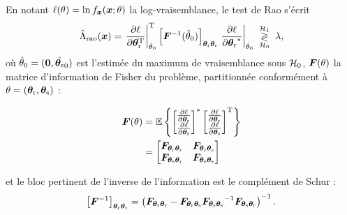 \begin{definition}
\label{def:detection-rao}
  En notant $\ell(\theta)=\ln f_{\boldsymbol{x}}(\boldsymbol{x};\theta)$ la log-vraisemblance, le test de Rao s'écrit
  \begin{equation}
    \hat{\Lambda}_{\mathrm{rao}}(\boldsymbol{x})
    =
    \left.\frac{\partial\ell}{\partial\boldsymbol{\theta}_{\mathrm{r}}^{\mathrm{T}}}\right|_{\hat{\theta}_0}^{\mathrm{T}}
    \left[{\boldsymbol{F}}^{-1}(\hat{\theta}_0)\right]_{\boldsymbol{\theta}_{\mathrm{r}}\boldsymbol{\theta}_{\mathrm{r}}}
    \left.\frac{\partial\ell}{\partial{\boldsymbol{\theta}_{\mathrm{r}}}^{*}}\right|_{\hat{\theta}_0}
    \;\underset{\mathcal{H}_0}{\overset{\mathcal{H}_1}{\gtrless}}\; \lambda,
    \label{eq:detection-rao}
  \end{equation}
  où $\hat{\theta}_0=(\boldsymbol{0},\hat{\boldsymbol{\theta}_{\mathrm{s}}}_0)$ est l'estimée du maximum de vraisemblance sous $\mathcal{H}_0$, $\boldsymbol{F}(\theta)$ la matrice d'information de Fisher du problème, partitionnée conformément à $\theta=(\boldsymbol{\theta}_{\mathrm{r}},\boldsymbol{\theta}_{\mathrm{s}})$ :

\begin{equation}
  \begin{aligned}
    \boldsymbol{F}(\theta) &= \operatorname{\mathbb{E}}\left\{  {\begin{bmatrix}
\frac{\partial\ell}{\partial\boldsymbol{\theta}_{\mathrm{r}}}\\
\frac{\partial\ell}{\partial\boldsymbol{\theta}_{\mathrm{s}}}
\end{bmatrix}}^{*}  \begin{bmatrix}
\frac{\partial\ell}{\partial\boldsymbol{\theta}_{\mathrm{r}}}\\
\frac{\partial\ell}{\partial\boldsymbol{\theta}_{\mathrm{s}}}
\end{bmatrix}^{\mathrm{T}} \right\}\\
& = \begin{bmatrix}
  \boldsymbol{F}_{\boldsymbol{\theta}_{\mathrm{r}}\boldsymbol{\theta}_{\mathrm{r}}} & \boldsymbol{F}_{\boldsymbol{\theta}_{\mathrm{r}}\boldsymbol{\theta}_{\mathrm{s}}}\\
  \boldsymbol{F}_{\boldsymbol{\theta}_{\mathrm{s}}\boldsymbol{\theta}_{\mathrm{r}}} & \boldsymbol{F}_{\boldsymbol{\theta}_{\mathrm{s}}\boldsymbol{\theta}_{\mathrm{s}}}
\end{bmatrix}
\end{aligned}
\label{eq:fim_detection}
\end{equation}

  et le bloc pertinent de l'inverse de l'information est le complément de Schur :
  \begin{equation}
    \left[{\boldsymbol{F}}^{-1}\right]_{\boldsymbol{\theta}_{\mathrm{r}}\boldsymbol{\theta}_{\mathrm{r}}}
    =
    \left(
      \boldsymbol{F}_{\boldsymbol{\theta}_{\mathrm{r}}\boldsymbol{\theta}_{\mathrm{r}}}
      - \boldsymbol{F}_{\boldsymbol{\theta}_{\mathrm{r}}\boldsymbol{\theta}_{\mathrm{s}}}{\boldsymbol{F}_{\boldsymbol{\theta}_{\mathrm{s}}\boldsymbol{\theta}_{\mathrm{s}}}}^{-1}\boldsymbol{F}_{\boldsymbol{\theta}_{\mathrm{s}}\boldsymbol{\theta}_{\mathrm{r}}}
    \right)^{-1}.
    \label{eq:detection-schur}
  \end{equation}
\end{definition}

